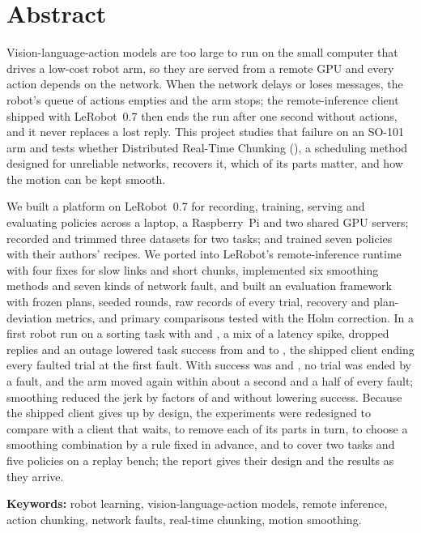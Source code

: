 
\chapter*{Abstract}
\thispagestyle{plain}

Vision-language-action models are too large to run on the small computer that drives a low-cost robot arm, so they are
served from a remote GPU and every action depends on the network. When the network delays or loses messages, the
robot's queue of actions empties and the arm stops; the remote-inference client shipped with LeRobot~0.7 then ends the
run after one second without actions, and it never replaces a lost reply. This project studies that failure on an
SO-101 arm and tests whether Distributed Real-Time Chunking (\drtc), a scheduling method designed for unreliable
networks, recovers it, which of its parts matter, and how the motion can be kept smooth.

We built a platform on LeRobot~0.7 for recording, training, serving and evaluating policies across a laptop, a
Raspberry~Pi and two shared GPU servers; recorded and trimmed three datasets for two tasks; and trained seven policies
with their authors' recipes. We ported \drtc{} into LeRobot's remote-inference runtime with four fixes for slow links and
short chunks, implemented six smoothing methods and seven kinds of network fault, and built an evaluation framework with
frozen plans, seeded rounds, raw records of every trial, recovery and plan-deviation metrics, and primary comparisons
tested with the Holm correction. In a first robot run on a sorting task with \smolvla{} and \groot, a mix of a latency
spike, dropped replies and an outage lowered task success from  and
 to , the shipped client ending every faulted trial at the first
fault. With \drtc{} success was  and , no trial was ended by a fault, and
the arm moved again within about a second and a half of every fault; smoothing reduced the jerk by factors of
 and  without lowering success. Because the shipped client gives up
by design, the experiments were redesigned to compare \drtc{} with a client that waits, to remove each of its parts in
turn, to choose a smoothing combination by a rule fixed in advance, and to cover two tasks and five policies on a
replay bench; the report gives their design and the results as they arrive.

\vspace{1em}
\noindent\textbf{Keywords:} robot learning, vision-language-action models, remote inference, action chunking,
network faults, real-time chunking, motion smoothing.
